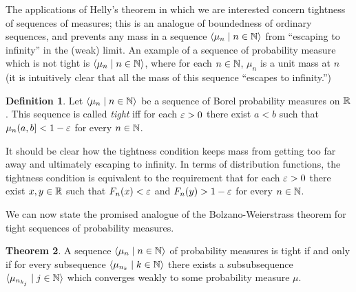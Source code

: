 \documentclass[leqno]{article}
\theoremstyle{definition}
\newtheorem{theorem}{Theorem}[section]
\newtheorem{definition}[theorem]{Definition}
\newcommand{\bldseq}[2]{\langle{#1}\mid{#2}\rangle}
\begin{document}
The applications of Helly's theorem in which we are interested concern tightness of sequences of measures; this is an analogue of boundedness of ordinary sequences, and prevents any mass in a sequence $\bldseq{\mu_n}{n \in \N}$ from ``escaping to infinity'' in the (weak) limit. An example of a sequence of probability measure which is not tight is $\bldseq{\mu_n}{n \in \N}$, where for each $n \in \mathbb{N}$, $\mu_n$ is a unit mass at $n$ (it is intuitively clear that all the mass of this sequence ``escapes to infinity.'')

\begin{definition}
Let $\bldseq{\mu_n}{n \in \N}$ be a sequence of Borel probability measures on $\mathbb{R}$. This sequence is called {\em tight} iff for each $\varepsilon > 0$ there exist $a < b$ such that $\mu_n (a,b] < 1 - \varepsilon$ for every $n \in \mathbb{N}$. 
\end{definition}

It should be clear how the tightness condition keeps mass from getting too far away and ultimately escaping to infinity. In terms of distribution functions, the tightness condition is equivalent to the requirement that for each $\varepsilon > 0$ there exist $x, y \in \mathbb{R}$ such that $F_n(x) < \varepsilon$ and $F_n(y) > 1 - \varepsilon$ for every $n \in \mathbb{N}$.

We can now state the promised analogue of the Bolzano-Weierstrass theorem for tight sequences of probability measures.

\begin{theorem}
A sequence $\bldseq{\mu_n}{n \in \N}$ of probability measures is tight if and only if for every subsequence $\bldseq{\mu_{n_k}}{k \in \N}$ there exists a subsubsequence $\bldseq{\mu_{n_{k_j}}}{j \in \N}$ which converges weakly to some probability measure $\mu$.
\end{theorem}
\end{document}
